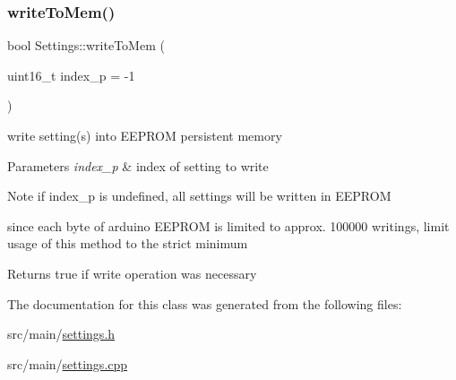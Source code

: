 \subsubsection{\texorpdfstring{write\+To\+Mem()}{writeToMem()}}
{\footnotesize\ttfamily bool Settings\+::write\+To\+Mem (\begin{DoxyParamCaption}\item[{uint16\+\_\+t}]{index\+\_\+p = {\ttfamily -\/1} }\end{DoxyParamCaption})\hspace{0.3cm}{\ttfamily [inline]}}



write setting(s) into E\+E\+P\+R\+OM persistent memory 


\begin{DoxyParams}{Parameters}
{\em index\+\_\+p} & index of setting to write \\
\hline
\end{DoxyParams}
\begin{DoxyNote}{Note}
if index\+\_\+p is undefined, all settings will be written in E\+E\+P\+R\+OM 

since each byte of arduino E\+E\+P\+R\+OM is limited to approx. 100000 writings, limit usage of this method to the strict minimum 
\end{DoxyNote}
\begin{DoxyReturn}{Returns}
true if write operation was necessary 
\end{DoxyReturn}


The documentation for this class was generated from the following files\+:\begin{DoxyCompactItemize}
\item 
src/main/\hyperlink{settings_8h}{settings.\+h}\item 
src/main/\hyperlink{settings_8cpp}{settings.\+cpp}\end{DoxyCompactItemize}
